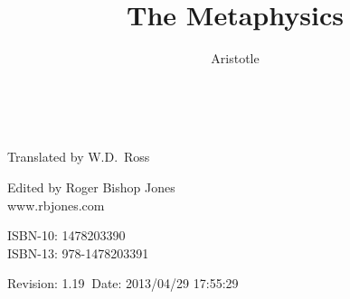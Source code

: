 \newcommand{\dq}{\texttt{"}}


\title{The Metaphysics}
\author{Aristotle}
\date{\ }



\renewcommand{\thechapter}{Book \arabic{chapter}}
\renewcommand{\thesection}{Part \arabic{section}}

\addtolength{\cftchapnumwidth}{3em}
\addtolength{\cftsecnumwidth}{2.5em}
\addtolength{\cftsubsecnumwidth}{0.5em}
\cftsetpnumwidth{2em}

\frontmatter

\begin{titlepage}
\maketitle

\hspace{2in}

\vfill

\begin{centering}

Translated by W.D.~Ross\\

\vspace{0.2in}

Edited by Roger Bishop Jones\\
www.rbjones.com\\

\vspace{0.2in}

ISBN-10: 1478203390\\
ISBN-13: 978-1478203391

\vspace{0.2in}

{\footnotesize

$ $Revision: 1.19 $~$Date: 2013/04/29 17:55:29 $ $

}%

\end{centering}

\thispagestyle{empty}
\end{titlepage}


{\parskip=0pt\tableofcontents}
\vfill

\renewcommand{\aref}{Book \arabic{chapter} Part \arabic{section}}

